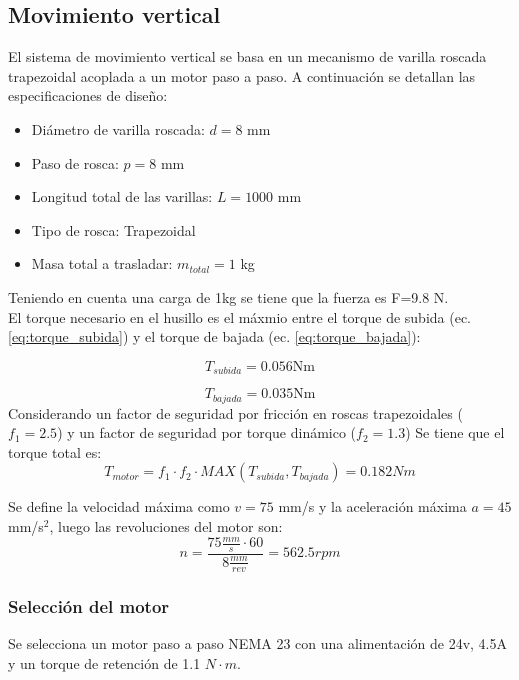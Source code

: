 \subsection{Movimiento vertical}
\label{sec:mov_vertical_prototipo}

El sistema de movimiento vertical se basa en un mecanismo de varilla roscada trapezoidal acoplada a un motor paso a paso. A continuación se detallan las especificaciones de diseño:

\begin{itemize}
    \item Diámetro de varilla roscada: $d = 8$ mm
    \item Paso de rosca: $p = 8$ mm
    \item Longitud total de las varillas: $L = 1000$ mm
    \item Tipo de rosca: Trapezoidal
    \item Masa total a trasladar: $m_{total} = 1$ kg
\end{itemize}

Teniendo en cuenta una carga de 1kg se tiene que la fuerza es F=9.8 N. \\

El torque necesario en el husillo es el máxmio entre el torque de subida (ec. \ref{eq:torque_subida}) y el torque de bajada (ec. \ref{eq:torque_bajada}):

\begin{equation}
T_{subida}= 0.056\text{Nm}
\end{equation}

\begin{equation}
T_{bajada}= 0.035 \text{Nm}
\end{equation}
Considerando un factor de seguridad por fricción en roscas trapezoidales (\(f_1=2.5\)) y un factor de seguridad por torque dinámico (\(f_2=1.3\))
Se tiene que el torque total es: 
\[T_{motor}=f_1 \cdot f_2 \cdot MAX(T_{subida}, T_{bajada})= 0.182Nm\]

Se define la velocidad máxima como $v = 75$ mm/s y la aceleración máxima $a = 45$ mm/s$^2$, luego las revoluciones del motor son:
\[n= \frac{ 75 \frac{mm}{s} \cdot 60}{8 \frac{mm}{rev}}=562.5 rpm\]

\subsubsection{Selección del motor}

Se selecciona un motor paso a paso NEMA 23 con una alimentación de 24v, 4.5A y un torque de retención de 1.1 \(N \cdot m\).

